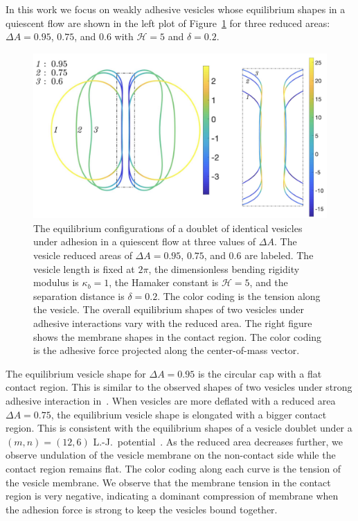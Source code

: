 \documentclass[prf,superscriptaddress,showkeys,longbibliography]{revtex4-1}
\begin{document}
In this work we focus on weakly adhesive vesicles whose equilibrium
shapes in a quiescent flow are shown in the left plot of
Figure~\ref{fig:Dec18_vesicle_shape} for three reduced areas: $\Delta
A=0.95$, $0.75$, and $0.6$ with $\mathcal{H}=5$ and $\delta = 0.2$. 
\begin{figure}
   \includegraphics[keepaspectratio=true,scale=0.45]{figs/Dec18_vesicle_shape_vs_rA_composite.png}
  \caption{\label{fig:Dec18_vesicle_shape} The equilibrium
  configurations of a doublet of identical vesicles under adhesion in a
  quiescent flow at three values of $\Delta A$.  The vesicle reduced
  areas of $\Delta A=0.95$, $0.75$, and $0.6$ are labeled.  The vesicle
  length is fixed at $2\pi$, the dimensionless bending rigidity modulus
  is $\kappa_b=1$, the Hamaker constant is $\mathcal{H}=5$, and the
  separation distance is $\delta=0.2$.  The color coding is the tension
  along the vesicle.  The overall equilibrium shapes of two vesicles
  under adhesive interactions vary with the reduced area.  The right
  figure shows the  membrane shapes in the contact region. The color
  coding is the adhesive force projected along the center-of-mass
  vector.} 
\end{figure}
The equilibrium vesicle shape for $\Delta A=0.95$ is the circular cap
with a flat contact region.  This is similar to the observed shapes of
two vesicles under strong adhesive interaction
in~\cite{RamachandranAndersonLealIsraelachvili2010_Langmuir}.  When
vesicles are more deflated with a reduced area $\Delta A = 0.75$, the
equilibrium vesicle shape is elongated with a bigger contact region.
This is consistent with the equilibrium shapes of a vesicle doublet
under a $(m,n) = (12,6)$
L.-J.~potential~\cite{FlormannAouane2017_SciReports}.  As the reduced
area decreases further, we observe undulation of the vesicle membrane on
the non-contact side while the contact region remains flat.  The color
coding along each curve is the tension of the vesicle membrane.  We
observe that the membrane tension in the contact region is very
negative, indicating a dominant compression of membrane when the
adhesion force is strong to keep the vesicles bound together.
\end{document}
